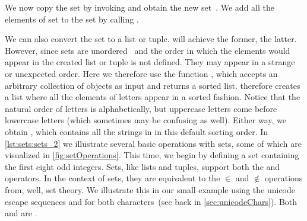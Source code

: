 We now copy the set  by invoking  and obtain the new set~.
We add all the elements of set  to the set  by calling .

We can also convert the set  to a list or tuple.
 will achieve the former,  the latter.
However, since sets are unordered~\cite{PSF2024STSF,PSF2024ST} and the order in which the elements would appear in the created list or tuple is not defined.
They may appear in a strange or unexpected order.
Here we therefore use the function , which accepts an arbitrary collection of objects as input and returns a sorted list.
 therefore creates a list where all the elements of letters appear in a sorted fashion.
Notice that the natural order of letters is alphabetically, but uppercase letters come before lowercase letters (which sometimes may be confusing as well).
Either way, we obtain , which contains all the strings in  in this default sorting order.%
%
%
%
In \cref{lst:sets:sets_2} we illustrate several basic operations with sets, some of which are visualized in \cref{fig:setOperations}.
This time, we begin by defining a set  containing the first eight odd integers.
Sets, like lists and tuples, support both the  and  operators.
In the context of sets, they are equivalent to the $\in$ and $\notin$ operations from, well, set theory.
We illustrate this in our small example using the unicode escape sequences  and  for both characters~(see back in \cref{sec:unicodeChars}).
Both  and  are .%
%
